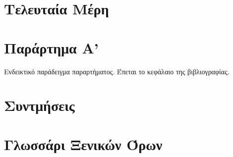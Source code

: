 \documentclass[a4paper,11pt,oneside,openany]{ioniothesis}
\begin{document}
\chapter{Τελευταία Μέρη} \label{chapter:telos}




\chapter*{Παράρτημα Α'} \pagestyle{empty}
Ενδεικτικό παράδειγμα παραρτήματος.
Έπεται το κεφάλαιο της βιβλιογραφίας.



\begin{thebibliography}{99} 
\pagestyle{headings}

\end{thebibliography}


\chapter*{Συντμήσεις} \pagestyle{empty}



\chapter*{Γλωσσάρι Ξενικών Όρων} \pagestyle{empty}






\newpage
{}
\printindex
\end{document}
